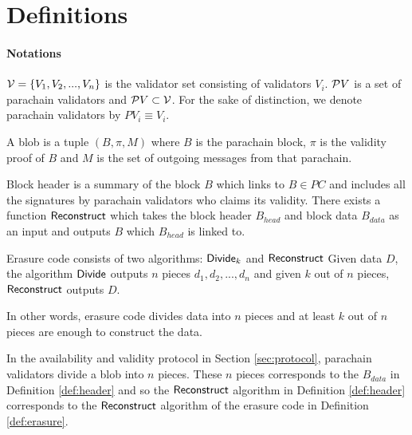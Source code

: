 \section{Definitions}

\paragraph{Notations} $\mathcal{V}= \{V_1,V_2,...,V_n\}$ is the validator set consisting of validators $V_i$. $\mathcal{P}V$ is a set of parachain validators and $\mathcal{P}V \subset \mathcal{V}$. For the sake of distinction, we denote parachain validators by $PV_i \equiv V_i$.

\begin{definition}[Blob]
A blob is a tuple $(B, \pi, M)$ where $B$ is the parachain block, $\pi$ is the validity proof of $B$ and $M$ is the set of outgoing messages from that parachain.
\end{definition}


\begin{definition}\label{def:header}
Block header is a summary of the block $B$ which links to $B\in PC$ and includes all the signatures by parachain validators who claims its validity. There exists a function $\mathsf{Reconstruct}$ which takes the block header $B_{head}$ and block data $B_{data}$ as an input and outputs $B$ which $B_{head}$ is linked to. 
\end{definition}



\begin{definition}\label{def:erasure}
Erasure code consists of two algorithms: $\mathsf{Divide}_k$ and $\mathsf{Reconstruct}$ Given data $D$, the algorithm $\mathsf{Divide}$ outputs $n$ pieces $d_1,d_2,...,d_n$ and given $k$ out of $n$ pieces, $\mathsf{Reconstruct}$ outputs $D$.  

\end{definition}

In other words, erasure code divides data into $n$ pieces and at least $k$ out of $n$ pieces are enough to construct the data.

In the availability and validity protocol in Section \ref{sec:protocol}, parachain validators divide a blob into $n$ pieces. These $n$ pieces corresponds to the $B_{data}$ in Definition \ref{def:header} and so the $\mathsf{Reconstruct}$ algorithm in Definition \ref{def:header}  corresponds to the $\mathsf{Reconstruct}$ algorithm of the erasure code in Definition \ref{def:erasure}.








